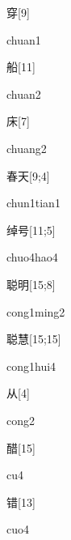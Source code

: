\begin{verbete}[chuan1]{穿}[9]
\begin{pronuncia}{chuan1}
\end{pronuncia}
\end{verbete}

\begin{verbete}[chuan2]{船}[11]
\begin{pronuncia}{chuan2}
\end{pronuncia}
\end{verbete}

\begin{verbete}[chuang2]{床}[7]
\begin{pronuncia}{chuang2}
\end{pronuncia}
\end{verbete}

\begin{verbete}{春天}[9;4]
\begin{pronuncia}{chun1tian1}
\end{pronuncia}
\end{verbete}

\begin{verbete}{绰号}[11;5]
\begin{pronuncia}{chuo4hao4}
\end{pronuncia}
\end{verbete}

\begin{verbete}{聪明}[15;8]
\begin{pronuncia}{cong1ming2}
\end{pronuncia}
\end{verbete}

\begin{verbete}{聪慧}[15;15]
\begin{pronuncia}{cong1hui4}
\end{pronuncia}
\end{verbete}

\begin{verbete}[cong2]{从}[4]
\begin{pronuncia}{cong2}
\end{pronuncia}
\end{verbete}

\begin{verbete}[cu4]{醋}[15]
\begin{pronuncia}{cu4}
\end{pronuncia}
\end{verbete}

\begin{verbete}[cuo4]{错}[13]
\begin{pronuncia}{cuo4}
\end{pronuncia}
\end{verbete}

